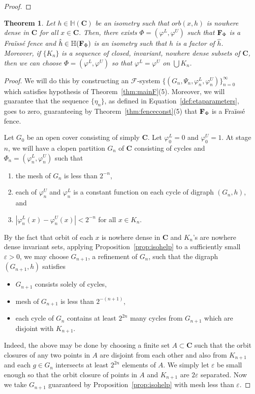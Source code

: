 \documentclass[11pt]{amsart}
\newtheorem{theorem}{Theorem}[section]
\newcommand{\cantor}{\mathbf C}
\newcommand{\fence}{{\bf F}_{\Phi}{}}
\newcommand{\groupcantor}{{\mathbb H}(\cantor)}
\newcommand{\groupfence}{{\mathbb{H}(\fence)}}
\newcommand{\cF}{\mathcal{F}}
\newcommand{\fsystem}{\{(G_n, \Psi_n,\varphi^L_n,\varphi^U_n)\}_{n=0}^{\infty}}
\begin{document}
{\begin{proof}
\end{proof}

\begin{theorem}\label{thm:liftingisometriesFraisse}
Let $h \in \groupcantor$ be an isometry such that $orb(x,h)$ is nowhere dense in $\cantor$ for all $x \in \cantor$. Then, there exists $\Phi = (\varphi^L, \varphi^U)$ such that $\fence$ is a Fra\"iss\'e  fence and $\hat{h} \in \groupfence$ is an isometry such that $h$ is a factor of $\hat{h}$. Moreover, if $\{K_n\}$ is a sequence of closed, invariant, nowhere dense subsets of $\cantor$, then we can choose $\Phi = (\varphi^L, \varphi^U)$ so that $\varphi^L = \varphi^U$ on $\bigcup K_n$.
\end{theorem}

\begin{proof}
 We will do this by constructing an $\cF$-system $\fsystem$ which satisfies hypothesis of Theorem~\ref{thm:mainF}(5). Moreover, we will guarantee that the sequence $\{\eta_n\}$, as defined in Equation~\ref{def:etaparameters}, goes to zero, guaranteeing by Theorem~\ref{thm:fenceconst}(5) that $\fence$ is a Fra\"iss\'e fence. 


 Let $G_0$ be an open cover consisting  of simply $\cantor$. Let $\varphi_0^L =0$ and $\varphi_0^U=1$. At stage $n$, we will have a clopen partition $G_n$ of $\cantor$ consisting of cycles and $\Phi_n = (\varphi^L_n, \varphi^U_n)$ such that 
 \begin{enumerate}[label=\alph*)]
    \item the mesh of $G_n$ is less than $2^{-n}$,
     \item each of $\varphi_n^U$ and  $\varphi_n^L$ is a constant function on each cycle of digraph $(G_n,h)$, and
     \item  $|\varphi_n^L(x) -\varphi_n^U(x)| < 2^{-n}$  for all $x \in K_n$.
 \end{enumerate}  By the fact that orbit of each $x$ is nowhere dense in $\cantor$ and $K_n$'s are nowhere dense invariant sets, applying  Proposition~\ref{prop:isohelp} to a sufficiently small $\varepsilon >0$, we may choose $G_{n+1}$, a refinement of $G_n$,
 such that the digraph $(G_{n+1},h)$ satisfies
 \begin{itemize}
     \item $G_{n+1}$ consists solely of cycles,
     \item mesh of $G_{n+1}$ is less than $2^{-(n+1)}$,
     \item each cycle of $G_n$ contains at least $2^{2n}$ many cycles from $G_{n+1}$ which are disjoint with $K_{n+1}$.
 \end{itemize} 
 Indeed, the above may be done by choosing a finite set $A \subset \cantor$ such that the orbit closures of any two points in $A$ are disjoint from each other and also from $K_{n+1}$ and each $g \in G_n$ intersects at least  $2^{2n}$ elements of $A$. We simply let $\varepsilon$ be small enough so that the orbit closure of points in $A$ and $K_{n+1}$ are $2\varepsilon$ separated. Now we take $G_{n+1}$ guaranteed by Proposition~\ref{prop:isohelp} with mesh less than $\varepsilon$.
 

\end{proof}}
\end{document}
